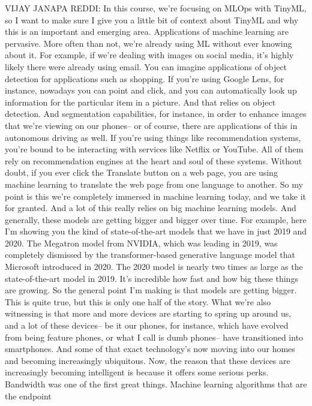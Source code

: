 VIJAY JANAPA REDDI: In this course, we're focusing on MLOps with TinyML,
so I want to make sure I give you a little bit of context about TinyML
and why this is an important and emerging area.
Applications of machine learning are pervasive.
More often than not, we're already using ML without ever knowing about it.
For example, if we're dealing with images on social media,
it's highly likely there were already using email.
You can imagine applications of object detection
for applications such as shopping.
If you're using Google Lens, for instance,
nowadays you can point and click, and you can automatically
look up information for the particular item in a picture.
And that relies on object detection.
And segmentation capabilities, for instance,
in order to enhance images that we're viewing on our phones--
or of course, there are applications of this in autonomous driving as well.
If you're using things like recommendation systems,
you're bound to be interacting with services like Netflix or YouTube.
All of them rely on recommendation engines
at the heart and soul of these systems.
Without doubt, if you ever click the Translate button on a web page,
you are using machine learning to translate the web
page from one language to another.
So my point is this we're completely immersed in machine learning today,
and we take it for granted.
And a lot of this really relies on big machine learning models.
And generally, these models are getting bigger and bigger over time.
For example, here I'm showing you the kind of state-of-the-art models that we
have in just 2019 and 2020.
The Megatron model from NVIDIA, which was leading in 2019,
was completely dismissed by the transformer-based generative language
model that Microsoft introduced in 2020.
The 2020 model is nearly two times as large as the state-of-the-art model
in 2019.
It's incredible how fast and how big these things are growing.
So the general point I'm making is that models are getting bigger.
This is quite true, but this is only one half of the story.
What we're also witnessing is that more and more devices are
starting to spring up around us, and a lot of these devices--
be it our phones, for instance, which have evolved from being feature phones,
or what I call is dumb phones--
have transitioned into smartphones.
And some of that exact technology's now moving into our homes
and becoming increasingly ubiquitous.
Now, the reason that these devices are increasingly becoming intelligent
is because it offers some serious perks.
Bandwidth was one of the first great things.
Machine learning algorithms that are the endpoint
